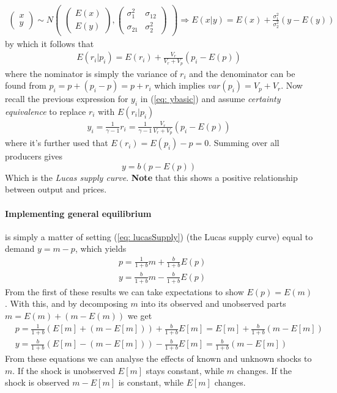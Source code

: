 \documentclass[12pt, a4paper]{article}
\begin{document}
\begin{spacing}{1.213}
\begin{align*}
\begin{pmatrix}
x \\
y
\end{pmatrix} \sim
N\begin{pmatrix}
\begin{pmatrix}
E(x) \\
E(y)
\end{pmatrix} ,
\begin{pmatrix}
\sigma^2_{1} & \sigma_{12}  \\
\sigma_{21}  & \sigma^2_{2}
\end{pmatrix}
\end{pmatrix}
\Rightarrow
E(x|y) = E(x) + \frac{\sigma_1^2}{\sigma_2^2}(y - E(y))
\end{align*}
by which it follows that 
\begin{align*}
E(r_i|p_i) = E(r_i) + \frac{V_r}{V_r + V_p}(p_i - E(p))
\end{align*}
where the nominator is simply the variance of $r_i$ and the denominator can be found from $p_i = p + (p_i -p) = p+ r_i$ which implies $var(p_i) = V_p + V_r$. Now recall the previous expression for $y_i$ in (\ref{eq: ybasic}) and assume \textit{certainty equivalence} to replace $r_i$ with $E(r_i|p_i)$ 
\begin{align*}
y_i = \frac{1}{\gamma -1}r_i = \frac{1}{\gamma -1}\frac{V_r}{V_r + V_p} (p_i - E(p))
\end{align*}
where it's further used that $E(r_i)=E(p_i)-p = 0$. Summing over all producers gives
\begin{equation} \label{eq: lucasSupply}
y = b(p-E(p))
\end{equation}
Which is the \textit{Lucas supply curve}. \textbf{Note} that this shows a positive relationship between output and prices.

\paragraph{Implementing general equilibrium} is simply a matter of setting (\ref{eq: lucasSupply}) (the Lucas supply curve) equal to demand $y = m - p$, which yields
\begin{align*}
&p = \frac{1}{1+b}m +\frac{b}{1+b} E(p) \\
& y = \frac{b}{1+b} m - \frac{b}{1+b} E(p)
\end{align*}
From the first of these results we can take expectations to show $E(p) = E(m)$. With this, and by decomposing $m$ into its observed and unobserved parts $m = E(m) + (m-E(m))$ we get
\begin{align*}
&p = \frac{1}{1+b}(E[m] + (m-E[m] )) + \frac{b}{1+b} E[m] = E[m] + \frac{b}{1+b}(m- E[m]) \\
& y = \frac{b}{1+b} ( E[m]- (m - E[m])) - \frac{b}{1+b} E[m] = \frac{b}{1+b} (m- E[m])
\end{align*}
From these equations we can analyse the effects of known and unknown shocks to $m$. If the shock is unobserved $E[m]$ stays constant, while $m$ changes. If the shock is observed $m - E[m]$ is constant, while $E[m]$ changes.


\end{spacing}
\end{document}
